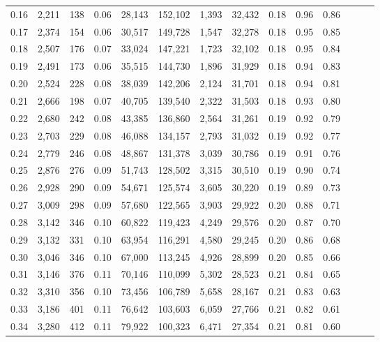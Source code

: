 \begin{tabular}{rrrrrrrrrrrrrr}
0.16 &  2,211 &  138 &  0.06 &   28,143 &  152,102 &   1,393 &  32,432 &  0.18 &  0.96 &      0.86 \\
0.17 &  2,374 &  154 &  0.06 &   30,517 &  149,728 &   1,547 &  32,278 &  0.18 &  0.95 &      0.85 \\
0.18 &  2,507 &  176 &  0.07 &   33,024 &  147,221 &   1,723 &  32,102 &  0.18 &  0.95 &      0.84 \\
0.19 &  2,491 &  173 &  0.06 &   35,515 &  144,730 &   1,896 &  31,929 &  0.18 &  0.94 &      0.83 \\
0.20 &  2,524 &  228 &  0.08 &   38,039 &  142,206 &   2,124 &  31,701 &  0.18 &  0.94 &      0.81 \\
0.21 &  2,666 &  198 &  0.07 &   40,705 &  139,540 &   2,322 &  31,503 &  0.18 &  0.93 &      0.80 \\
0.22 &  2,680 &  242 &  0.08 &   43,385 &  136,860 &   2,564 &  31,261 &  0.19 &  0.92 &      0.79 \\
0.23 &  2,703 &  229 &  0.08 &   46,088 &  134,157 &   2,793 &  31,032 &  0.19 &  0.92 &      0.77 \\
0.24 &  2,779 &  246 &  0.08 &   48,867 &  131,378 &   3,039 &  30,786 &  0.19 &  0.91 &      0.76 \\
0.25 &  2,876 &  276 &  0.09 &   51,743 &  128,502 &   3,315 &  30,510 &  0.19 &  0.90 &      0.74 \\
0.26 &  2,928 &  290 &  0.09 &   54,671 &  125,574 &   3,605 &  30,220 &  0.19 &  0.89 &      0.73 \\
0.27 &  3,009 &  298 &  0.09 &   57,680 &  122,565 &   3,903 &  29,922 &  0.20 &  0.88 &      0.71 \\
0.28 &  3,142 &  346 &  0.10 &   60,822 &  119,423 &   4,249 &  29,576 &  0.20 &  0.87 &      0.70 \\
0.29 &  3,132 &  331 &  0.10 &   63,954 &  116,291 &   4,580 &  29,245 &  0.20 &  0.86 &      0.68 \\
0.30 &  3,046 &  346 &  0.10 &   67,000 &  113,245 &   4,926 &  28,899 &  0.20 &  0.85 &      0.66 \\
0.31 &  3,146 &  376 &  0.11 &   70,146 &  110,099 &   5,302 &  28,523 &  0.21 &  0.84 &      0.65 \\
0.32 &  3,310 &  356 &  0.10 &   73,456 &  106,789 &   5,658 &  28,167 &  0.21 &  0.83 &      0.63 \\
0.33 &  3,186 &  401 &  0.11 &   76,642 &  103,603 &   6,059 &  27,766 &  0.21 &  0.82 &      0.61 \\
0.34 &  3,280 &  412 &  0.11 &   79,922 &  100,323 &   6,471 &  27,354 &  0.21 &  0.81 &      0.60 \\

\end{tabular}
